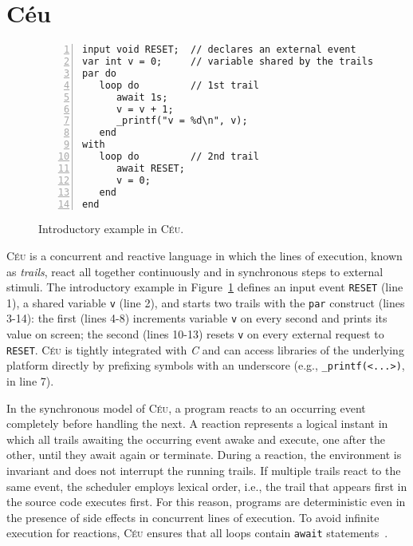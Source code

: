 \documentclass{acm_proc_article-sp}
\newcommand{\CEU}{\textsc{C\'{e}u}\xspace}
\newcommand{\code}[1] {{\small{\texttt{#1}}}}
\begin{document}
\newpage
\section{C\'eu}

\begin{comment}
\item adts
\item description
\item expansion: pool / recursive spawn
\item mutation / safety / watching
\end{comment}

\begin{figure}%
\begin{lstlisting}[numbers=left,xleftmargin=3em]
input void RESET;  // declares an external event
var int v = 0;     // variable shared by the trails
par do
   loop do         // 1st trail
      await 1s;
      v = v + 1;
      _printf("v = %d\n", v);
   end
with
   loop do         // 2nd trail
      await RESET;
      v = 0;
   end
end
\end{lstlisting}
\caption{ Introductory example in \CEU.
\label{lst.intro}
}
\end{figure}

\CEU is a concurrent and reactive language in which the lines of execution, 
known as \emph{trails}, react all together continuously and in synchronous 
steps to external stimuli.
The introductory example in Figure~\ref{lst.intro} defines an input event 
\code{RESET} (line 1), a shared variable \code{v} (line 2), and starts two 
trails with the \code{par} construct (lines 3-14): the first (lines 4-8) 
increments variable \code{v} on every second and prints its value on screen; 
the second (lines 10-13) resets \code{v} on every external request to 
\code{RESET}.
\CEU is tightly integrated with \emph{C} and can access libraries of the 
underlying platform directly by prefixing symbols with an underscore (e.g., 
\code{\_printf(<...>)}, in line 7).

In the synchronous model of \CEU, a program reacts to an occurring event 
completely before handling the next.
%
A reaction represents a logical instant in which all trails awaiting the 
occurring event awake and execute, one after the other, until they await again 
or terminate.
%
During a reaction, the environment is invariant and does not interrupt the 
running trails.
If multiple trails react to the same event, the scheduler employs lexical 
order, i.e., the trail that appears first in the source code executes first.
%
For this reason, programs are deterministic even in the presence of side 
effects in concurrent lines of execution.
%
To avoid infinite execution for reactions, \CEU ensures that all loops contain 
\code{await} statements~\cite{ceu.sensys13}.
\end{document}
